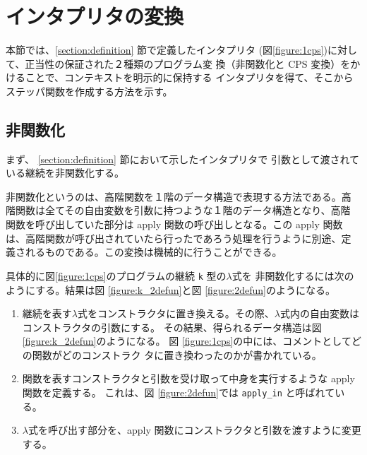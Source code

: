 \section{インタプリタの変換}
\label{section:transform}

本節では、\ref{section:definition} 節で定義したインタプリタ
(図\ref{figure:1cps})に対して、正当性の保証された２種類のプログラム変
換（非関数化と CPS 変換）をかけることで、コンテキストを明示的に保持する
インタプリタを得て、そこからステッパ関数を作成する方法を示す。


\subsection{非関数化}
\label{section:2defun}

まず、 \ref{section:definition} 節において示したインタプリタで
引数として渡されている継続を非関数化する。

非関数化というのは、高階関数を１階のデータ構造で表現する方法である。高
階関数は全てその自由変数を引数に持つような１階のデータ構造となり、高階
関数を呼び出していた部分は apply 関数の呼び出しとなる。この apply 関数
は、高階関数が呼び出されていたら行ったであろう処理を行うように別途、定
義されるものである。この変換は機械的に行うことができる。

具体的に図\ref{figure:1cps}のプログラムの継続 \texttt{k} 型の$\lambda$式を
非関数化するには次のようにする。結果は図 \ref{figure:k_2defun}と図 \ref{figure:2defun}のようになる。

\begin{enumerate}
\item 継続を表す$\lambda$式をコンストラクタに置き換える。その際、$\lambda$式内の自由変数はコンストラクタの引数にする。
その結果、得られるデータ構造は図 \ref{figure:k_2defun}のようになる。
図 \ref{figure:1cps}の中には、コメントとしてどの関数がどのコンストラク
タに置き換わったのかが書かれている。
\item 関数を表すコンストラクタと引数を受け取って中身を実行するような apply 関数を定義する。
これは、図 \ref{figure:2defun}では \texttt{apply\_in} と呼ばれている。
\item $\lambda$式を呼び出す部分を、apply 関数にコンストラクタと引数を渡すように変更する。
\end{enumerate}

